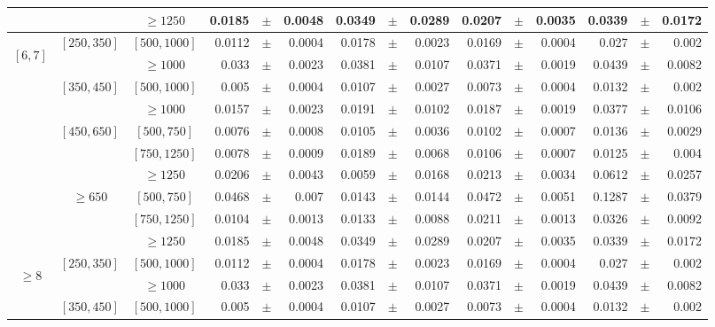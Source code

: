 \begin{table}[ht]
\begin{center}
{\begin{tabular}{c|c|c|rrr|rrr|rrr|rrr|}
 \\
&
&$\geq1250$
 & 0.0185&$\pm$&0.0048& 0.0349&$\pm$&0.0289& 0.0207&$\pm$&0.0035& 0.0339&$\pm$&0.0172
 \\
\cline{2-15}
\hline
\hline
\multirow{10}{*}{\begin{sideways}$[6,7]$\end{sideways}}
&\multirow{2}{*}{$[250,350]$}
&$[500,1000]$
 & 0.0112&$\pm$&0.0004& 0.0178&$\pm$&0.0023& 0.0169&$\pm$&0.0004& 0.027&$\pm$&0.002
 \\
&
&$\geq1000$
 & 0.033&$\pm$&0.0023& 0.0381&$\pm$&0.0107& 0.0371&$\pm$&0.0019& 0.0439&$\pm$&0.0082
 \\
\cline{2-15}
&\multirow{2}{*}{$[350,450]$}
&$[500,1000]$
 & 0.005&$\pm$&0.0004& 0.0107&$\pm$&0.0027& 0.0073&$\pm$&0.0004& 0.0132&$\pm$&0.002
 \\
&
&$\geq1000$
 & 0.0157&$\pm$&0.0023& 0.0191&$\pm$&0.0102& 0.0187&$\pm$&0.0019& 0.0377&$\pm$&0.0106
 \\
\cline{2-15}
&\multirow{3}{*}{$[450,650]$}
&$[500,750]$
 & 0.0076&$\pm$&0.0008& 0.0105&$\pm$&0.0036& 0.0102&$\pm$&0.0007& 0.0136&$\pm$&0.0029
 \\
&
&$[750,1250]$
 & 0.0078&$\pm$&0.0009& 0.0189&$\pm$&0.0068& 0.0106&$\pm$&0.0007& 0.0125&$\pm$&0.004
 \\
&
&$\geq1250$
 & 0.0206&$\pm$&0.0043& 0.0059&$\pm$&0.0168& 0.0213&$\pm$&0.0034& 0.0612&$\pm$&0.0257
 \\
\cline{2-15}
&\multirow{3}{*}{$\geq650$}
&$[500,750]$
 & 0.0468&$\pm$&0.007& 0.0143&$\pm$&0.0144& 0.0472&$\pm$&0.0051& 0.1287&$\pm$&0.0379
 \\
&
&$[750,1250]$
 & 0.0104&$\pm$&0.0013& 0.0133&$\pm$&0.0088& 0.0211&$\pm$&0.0013& 0.0326&$\pm$&0.0092
 \\
&
&$\geq1250$
 & 0.0185&$\pm$&0.0048& 0.0349&$\pm$&0.0289& 0.0207&$\pm$&0.0035& 0.0339&$\pm$&0.0172
 \\
\cline{2-15}
\hline
\hline
\multirow{8}{*}{\begin{sideways}$\geq8$\end{sideways}}
&\multirow{2}{*}{$[250,350]$}
&$[500,1000]$
 & 0.0112&$\pm$&0.0004& 0.0178&$\pm$&0.0023& 0.0169&$\pm$&0.0004& 0.027&$\pm$&0.002
 \\
&
&$\geq1000$
 & 0.033&$\pm$&0.0023& 0.0381&$\pm$&0.0107& 0.0371&$\pm$&0.0019& 0.0439&$\pm$&0.0082
 \\
\cline{2-15}
&\multirow{2}{*}{$[350,450]$}
&$[500,1000]$
 & 0.005&$\pm$&0.0004& 0.0107&$\pm$&0.0027& 0.0073&$\pm$&0.0004& 0.0132&$\pm$&0.002
 \\

\end{tabular}}
\end{center}
\end{table}
